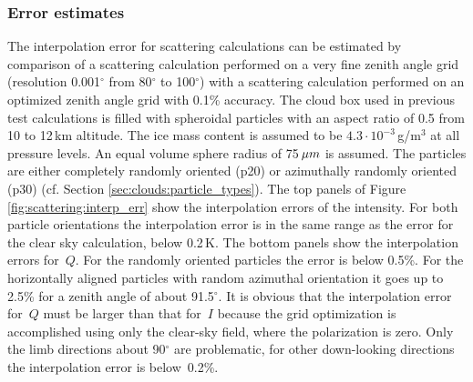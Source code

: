 \subsubsection{Error estimates}
The interpolation error for scattering calculations can be estimated
by comparison of a scattering calculation performed on a very fine
zenith angle grid (resolution 0.001$^\circ$ from 80$^\circ$ to
100$^\circ$) with a scattering calculation performed on an optimized
zenith angle grid with 0.1\% accuracy. The cloud box used in previous
test calculations is filled with spheroidal particles with an aspect
ratio of 0.5 from 10 to 12\,km altitude. The ice mass content is
assumed to be $4.3\cdot10^{-3}$\,g/m$^3$ at all pressure levels.  
An equal volume sphere radius of 75$\,\mu m$ is assumed. The particles are
either completely randomly oriented (p20) or azimuthally randomly
oriented (p30) (cf. Section \ref{sec:clouds:particle_types}).
The top panels of
Figure \ref{fig:scattering:interp_err} show the interpolation errors of the
intensity.  For both particle orientations the interpolation error is
in the same range as the error for the clear sky calculation, below
0.2\,K. The bottom panels show the interpolation errors for~$Q$. For the
randomly oriented particles the error is below 0.5\%. For the
horizontally aligned particles with random azimuthal orientation it goes up to 2.5\% for a
zenith angle of about 91.5$^\circ$. It is obvious that the
interpolation error for~$Q$ must be larger than that for~$I$ because the
grid optimization is accomplished using only the clear-sky field,
where the polarization is zero. Only the limb directions about
90$^\circ$ are problematic, for other down-looking directions the
interpolation error is below~0.2\%.

